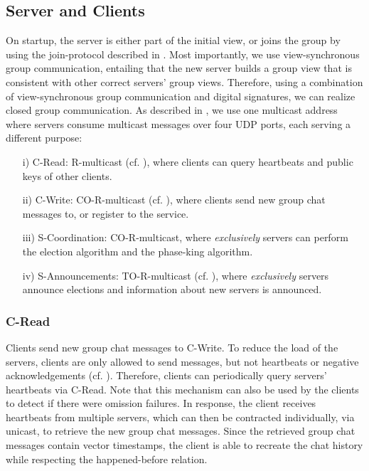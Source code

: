 \documentclass[runningheads]{llncs}
\begin{document}
\subsection{Server and Clients} \label{sec:overview}
On startup, the server is either part of the initial view, or joins the group by using the join-protocol described in . Most importantly, we use view-synchronous group communication, entailing that the new server builds a group view that is consistent with other correct servers' group views. Therefore, using a combination of view-synchronous group communication and digital signatures, we can realize closed group communication. As described in , we use one multicast address where servers consume multicast messages over four UDP ports, each serving a different purpose:
\begin{enumerate}
    \item[i)] \textsf{C-Read}: R-multicast (cf. ), where clients can query heartbeats and public keys of other clients.
    \item[ii)] \textsf{C-Write}: CO-R-multicast (cf. ), where clients send new group chat messages to, or register to the service.
    \item[iii)] \textsf{S-Coordination}: CO-R-multicast, where \textit{exclusively} servers can perform the election algorithm and the phase-king algorithm.
    \item[iv)] \textsf{S-Announcements}: TO-R-multicast (cf. ), where \textit{exclusively} servers announce elections and information about new servers is announced.
\end{enumerate}

\subsubsection{C-Read} 
Clients send new group chat messages to \textsf{C-Write}. To reduce the load of the servers, clients are only allowed to send messages, but not heartbeats or negative acknowledgements (cf. ). Therefore, clients can periodically query servers' heartbeats via \textsf{C-Read}. Note that this mechanism can also be used by the clients to detect if there were omission failures. In response, the client receives heartbeats from multiple servers, which can then be contracted individually, via unicast, to retrieve the new group chat messages. Since the retrieved group chat messages contain vector timestamps, the client is able to recreate the chat history while respecting the happened-before relation.
\end{document}
